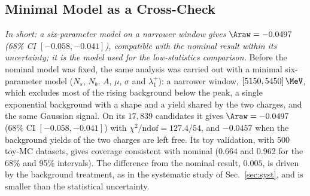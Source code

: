 \subsection{Minimal Model as a Cross-Check}
\label{sec:bayes_minimal}
\emph{In short: a six-parameter model on a narrower window gives $\Araw=-0.0497$ (68\% CI $[-0.058,-0.041]$), compatible with the nominal result within its uncertainty; it is the model used for the low-statistics comparison.}
Before the nominal model was fixed, the same analysis was carried out with a minimal six-parameter model ($N_s$, $N_b$, $A$, $\mu$, $\sigma$ and $\lambda_1^+$): a narrower window, $[5150,5450]\,\MeV$, which excludes most of the rising background below the peak, a single exponential background with a shape and a yield shared by the two charges, and the same Gaussian signal. On its $17{,}839$ candidates it gives $\Araw=-0.0497$ (68\% CI $[-0.058,-0.041]$) with $\chi^2/\text{ndof}=127.4/54$, and $-0.0457$ when the background yields of the two charges are left free. Its toy validation, with 500 toy-MC datasets, gives coverage consistent with nominal (0.664 and 0.962 for the 68\% and 95\% intervals). The difference from the nominal result, $0.005$, is driven by the background treatment, as in the systematic study of Sec.~\ref{sec:syst}, and is smaller than the statistical uncertainty.
\FloatBarrier
